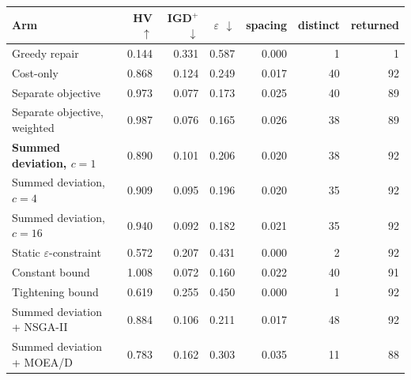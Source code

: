 \begin{tabular}{lrrrrrr}
\toprule
\textbf{Arm} & HV $\uparrow$ & IGD$^{+}$ $\downarrow$ & $\varepsilon$ $\downarrow$ & spacing & distinct & returned \\
\midrule
Greedy repair & 0.144 & 0.331 & 0.587 & 0.000 & 1 & 1 \\
Cost-only & 0.868 & 0.124 & 0.249 & 0.017 & 40 & 92 \\
Separate objective & 0.973 & 0.077 & 0.173 & 0.025 & 40 & 89 \\
Separate objective, weighted & 0.987 & 0.076 & 0.165 & 0.026 & 38 & 89 \\
\textbf{Summed deviation, $c=1$} & 0.890 & 0.101 & 0.206 & 0.020 & 38 & 92 \\
Summed deviation, $c=4$ & 0.909 & 0.095 & 0.196 & 0.020 & 35 & 92 \\
Summed deviation, $c=16$ & 0.940 & 0.092 & 0.182 & 0.021 & 35 & 92 \\
Static $\varepsilon$-constraint & 0.572 & 0.207 & 0.431 & 0.000 & 2 & 92 \\
Constant bound & 1.008 & 0.072 & 0.160 & 0.022 & 40 & 91 \\
Tightening bound & 0.619 & 0.255 & 0.450 & 0.000 & 1 & 92 \\
Summed deviation + NSGA-II & 0.884 & 0.106 & 0.211 & 0.017 & 48 & 92 \\
Summed deviation + MOEA/D & 0.783 & 0.162 & 0.303 & 0.035 & 11 & 88 \\
\bottomrule
\end{tabular}
